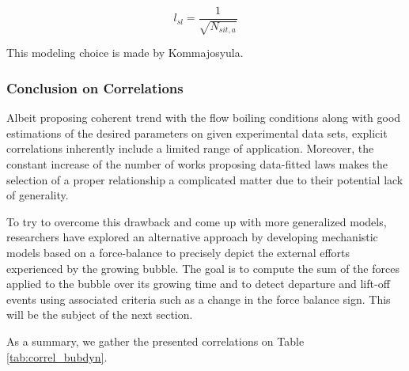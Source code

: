 \begin{equation}
l_{sl} = \frac{1}{\sqrt{N_{sit,a}}}
\label{eq:lsl_avgdist_bub}
\end{equation}

\begin{note*}{}
This modeling choice is made by Kommajosyula.
\end{note*}

\subsubsection{Conclusion on Correlations}

Albeit proposing coherent trend with the flow boiling conditions along with good estimations of the desired parameters on given experimental data sets, explicit correlations inherently include a limited range of application. Moreover, the constant increase of the number of works proposing data-fitted laws makes the selection of a proper relationship a complicated matter due to their potential lack of generality.

\npar

To try to overcome this drawback and come up with more generalized models, researchers have explored an alternative approach by developing mechanistic models based on a force-balance to precisely depict the external efforts experienced by the growing bubble. The goal is to compute the sum of the forces applied to the bubble over its growing time and to detect departure and lift-off events using associated criteria such as a change in the force balance sign. This will be the subject of the next section.

\npar

As a summary, we gather the presented correlations on Table \ref{tab:correl_bubdyn}.


